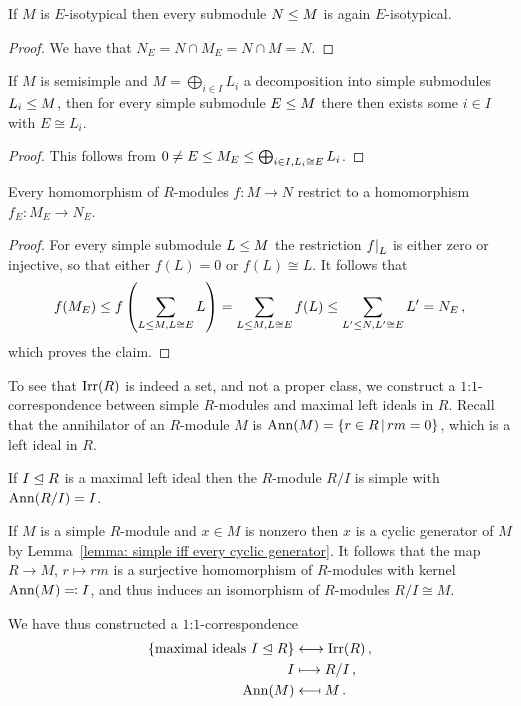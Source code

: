 \begin{corollary}
  If $M$ is $E$-isotypical then every submodule $N \leq M$ is again $E$-isotypical.
\end{corollary}


\begin{proof}
  We have that $N_E = N \cap M_E = N \cap M = N$.
\end{proof}


\begin{lemma}
  If $M$ is semisimple and $M = \bigoplus_{i \in I} L_i$ a decomposition into simple submodules $L_i \leq M$, then for every simple submodule $E \leq M$ there then exists some $i \in I$ with $E \cong L_i$.
\end{lemma}


\begin{proof}
  This follows from $0 \neq E \leq M_E \leq \bigoplus_{i \in I, L_i \cong E} L_i$.
\end{proof}


\begin{lemma}
  Every homomorphism of $R$-modules $f \colon M \to N$ restrict to a homomorphism $f_E \colon M_E \to N_E$.
\end{lemma}


\begin{proof}
  For every simple submodule $L \leq M$ the restriction $\restrict{f}{L}$ is either zero or injective, so that either $f(L) = 0$ or $f(L) \cong L$.
  It follows that
  \[
              f(M_E)
    \leq f\left(\sum_{L \leq M, L \cong E} L \right)
    =         \sum_{L \leq M, L \cong E} f(L)
    \leq \sum_{L' \leq N, L' \cong E} L'
    =         N_E \,,
  \]
  which proves the claim.
\end{proof}


\begin{remark}
  To see that $\operatorname{Irr}(R)$ is indeed a set, and not a proper class, we construct a $1$:$1$-correspondence between simple $R$-modules and maximal left ideals in $R$.
  Recall that the annihilator of an $R$-module $M$ is $\Ann(M) = \{r \in R \suchthat rm = 0\}$, which is a left ideal in $R$.
  
  If $I \trianglelefteq R$ is a maximal left ideal then the $R$-module $R/I$ is simple with $\operatorname{Ann}(R/I) = I$.
  
  If $M$ is a simple $R$-module and $x \in M$ is nonzero then $x$ is a cyclic generator of $M$ by Lemma~\ref{lemma: simple iff every cyclic generator}.
  It follows that the map $R \to M$, $r \mapsto rm$ is a surjective homomorphism of $R$-modules with kernel $\operatorname{Ann}(M) \eqqcolon I$, and thus induces an isomorphism of $R$-modules $R/I \cong M$.
  
  We have thus constructed a $1$:$1$-correspondence
  \begin{align*}
    \{ \text{maximal ideals $I \trianglelefteq R$} \}
    &\longleftrightarrow
    \operatorname{Irr}(R) \,, 
    \\
    I
    &\longmapsto
    R/I \,,
    \\
    \operatorname{Ann}(M)
    &\longmapsfrom
    M \,.
  \end{align*}
\end{remark}




